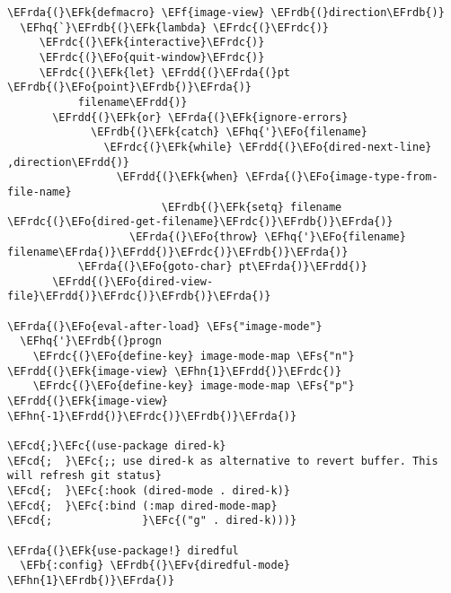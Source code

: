 \documentclass[a4wide,10pt]{article}
\newcommand{\EFc}[1]{\textcolor{EFc}{#1}} %
\newcommand{\EFcd}[1]{\textcolor{EFcd}{#1}} %
\newcommand{\EFs}[1]{\textcolor{EFs}{#1}} %
\newcommand{\EFk}[1]{\textcolor{EFk}{#1}} %
\newcommand{\EFb}[1]{\textcolor{EFb}{#1}} %
\newcommand{\EFf}[1]{\textcolor{EFf}{#1}} %
\newcommand{\EFv}[1]{\textcolor{EFv}{#1}} %
\newcommand{\EFo}[1]{\textcolor{EFo}{#1}} %
\newcommand{\EFhn}[1]{\textcolor{EFhn}{\textbf{#1}}} %
\newcommand{\EFhq}[1]{\textcolor{EFhq}{#1}} %
\newcommand{\EFrda}[1]{\textcolor{EFrda}{#1}} %
\newcommand{\EFrdb}[1]{\textcolor{EFrdb}{#1}} %
\newcommand{\EFrdc}[1]{\textcolor{EFrdc}{#1}} %
\newcommand{\EFrdd}[1]{\textcolor{EFrdd}{#1}} %
\begin{document}
\begin{Code}
\begin{Verbatim}
\EFrda{(}\EFk{defmacro} \EFf{image-view} \EFrdb{(}direction\EFrdb{)}
  \EFhq{`}\EFrdb{(}\EFk{lambda} \EFrdc{(}\EFrdc{)}
     \EFrdc{(}\EFk{interactive}\EFrdc{)}
     \EFrdc{(}\EFo{quit-window}\EFrdc{)}
     \EFrdc{(}\EFk{let} \EFrdd{(}\EFrda{(}pt \EFrdb{(}\EFo{point}\EFrdb{)}\EFrda{)}
           filename\EFrdd{)}
       \EFrdd{(}\EFk{or} \EFrda{(}\EFk{ignore-errors}
             \EFrdb{(}\EFk{catch} \EFhq{'}\EFo{filename}
               \EFrdc{(}\EFk{while} \EFrdd{(}\EFo{dired-next-line} ,direction\EFrdd{)}
                 \EFrdd{(}\EFk{when} \EFrda{(}\EFo{image-type-from-file-name}
                        \EFrdb{(}\EFk{setq} filename \EFrdc{(}\EFo{dired-get-filename}\EFrdc{)}\EFrdb{)}\EFrda{)}
                   \EFrda{(}\EFo{throw} \EFhq{'}\EFo{filename} filename\EFrda{)}\EFrdd{)}\EFrdc{)}\EFrdb{)}\EFrda{)}
           \EFrda{(}\EFo{goto-char} pt\EFrda{)}\EFrdd{)}
       \EFrdd{(}\EFo{dired-view-file}\EFrdd{)}\EFrdc{)}\EFrdb{)}\EFrda{)}

\EFrda{(}\EFo{eval-after-load} \EFs{"image-mode"}
  \EFhq{'}\EFrdb{(}progn
    \EFrdc{(}\EFo{define-key} image-mode-map \EFs{"n"} \EFrdd{(}\EFk{image-view} \EFhn{1}\EFrdd{)}\EFrdc{)}
    \EFrdc{(}\EFo{define-key} image-mode-map \EFs{"p"} \EFrdd{(}\EFk{image-view} \EFhn{-1}\EFrdd{)}\EFrdc{)}\EFrdb{)}\EFrda{)}

\EFcd{;}\EFc{(use-package dired-k}
\EFcd{;  }\EFc{;; use dired-k as alternative to revert buffer. This will refresh git status}
\EFcd{;  }\EFc{:hook (dired-mode . dired-k)}
\EFcd{;  }\EFc{:bind (:map dired-mode-map}
\EFcd{;              }\EFc{("g" . dired-k)))}

\EFrda{(}\EFk{use-package!} diredful
  \EFb{:config} \EFrdb{(}\EFv{diredful-mode} \EFhn{1}\EFrdb{)}\EFrda{)}


\end{Verbatim}
\end{Code}
\end{document}
